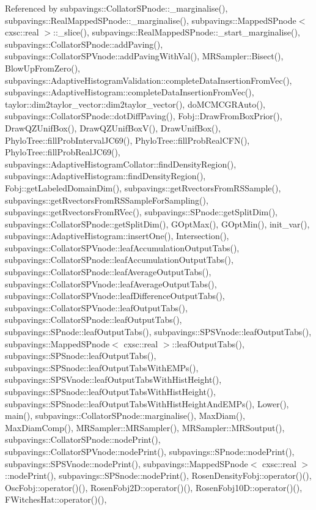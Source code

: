 \-Referenced by subpavings\-::\-Collator\-S\-Pnode\-::\-\_\-marginalise(), subpavings\-::\-Real\-Mapped\-S\-Pnode\-::\-\_\-marginalise(), subpavings\-::\-Mapped\-S\-Pnode$<$ cxsc\-::real $>$\-::\-\_\-slice(), subpavings\-::\-Real\-Mapped\-S\-Pnode\-::\-\_\-start\-\_\-marginalise(), subpavings\-::\-Collator\-S\-Pnode\-::add\-Paving(), subpavings\-::\-Collator\-S\-P\-Vnode\-::add\-Paving\-With\-Val(), \-M\-R\-Sampler\-::\-Bisect(), \-Blow\-Up\-From\-Zero(), subpavings\-::\-Adaptive\-Histogram\-Validation\-::complete\-Data\-Insertion\-From\-Vec(), subpavings\-::\-Adaptive\-Histogram\-::complete\-Data\-Insertion\-From\-Vec(), taylor\-::dim2taylor\-\_\-vector\-::dim2taylor\-\_\-vector(), do\-M\-C\-M\-C\-G\-R\-Auto(), subpavings\-::\-Collator\-S\-Pnode\-::dot\-Diff\-Paving(), \-Fobj\-::\-Draw\-From\-Box\-Prior(), \-Draw\-Q\-Z\-Unif\-Box(), \-Draw\-Q\-Z\-Unif\-Box\-V(), \-Draw\-Unif\-Box(), \-Phylo\-Tree\-::fill\-Prob\-Interval\-J\-C69(), \-Phylo\-Tree\-::fill\-Prob\-Real\-C\-F\-N(), \-Phylo\-Tree\-::fill\-Prob\-Real\-J\-C69(), subpavings\-::\-Adaptive\-Histogram\-Collator\-::find\-Density\-Region(), subpavings\-::\-Adaptive\-Histogram\-::find\-Density\-Region(), \-Fobj\-::get\-Labeled\-Domain\-Dim(), subpavings\-::get\-Rvectors\-From\-R\-S\-Sample(), subpavings\-::get\-Rvectors\-From\-R\-S\-Sample\-For\-Sampling(), subpavings\-::get\-Rvectors\-From\-R\-Vec(), subpavings\-::\-S\-Pnode\-::get\-Split\-Dim(), subpavings\-::\-Collator\-S\-Pnode\-::get\-Split\-Dim(), \-G\-Opt\-Max(), \-G\-Opt\-Min(), init\-\_\-var(), subpavings\-::\-Adaptive\-Histogram\-::insert\-One(), \-Intersection(), subpavings\-::\-Collator\-S\-P\-Vnode\-::leaf\-Accumulation\-Output\-Tabs(), subpavings\-::\-Collator\-S\-Pnode\-::leaf\-Accumulation\-Output\-Tabs(), subpavings\-::\-Collator\-S\-Pnode\-::leaf\-Average\-Output\-Tabs(), subpavings\-::\-Collator\-S\-P\-Vnode\-::leaf\-Average\-Output\-Tabs(), subpavings\-::\-Collator\-S\-P\-Vnode\-::leaf\-Difference\-Output\-Tabs(), subpavings\-::\-Collator\-S\-P\-Vnode\-::leaf\-Output\-Tabs(), subpavings\-::\-Collator\-S\-Pnode\-::leaf\-Output\-Tabs(), subpavings\-::\-S\-Pnode\-::leaf\-Output\-Tabs(), subpavings\-::\-S\-P\-S\-Vnode\-::leaf\-Output\-Tabs(), subpavings\-::\-Mapped\-S\-Pnode$<$ cxsc\-::real $>$\-::leaf\-Output\-Tabs(), subpavings\-::\-S\-P\-Snode\-::leaf\-Output\-Tabs(), subpavings\-::\-S\-P\-Snode\-::leaf\-Output\-Tabs\-With\-E\-M\-Ps(), subpavings\-::\-S\-P\-S\-Vnode\-::leaf\-Output\-Tabs\-With\-Hist\-Height(), subpavings\-::\-S\-P\-Snode\-::leaf\-Output\-Tabs\-With\-Hist\-Height(), subpavings\-::\-S\-P\-Snode\-::leaf\-Output\-Tabs\-With\-Hist\-Height\-And\-E\-M\-Ps(), \-Lower(), main(), subpavings\-::\-Collator\-S\-Pnode\-::marginalise(), \-Max\-Diam(), \-Max\-Diam\-Comp(), \-M\-R\-Sampler\-::\-M\-R\-Sampler(), \-M\-R\-Sampler\-::\-M\-R\-Soutput(), subpavings\-::\-Collator\-S\-Pnode\-::node\-Print(), subpavings\-::\-Collator\-S\-P\-Vnode\-::node\-Print(), subpavings\-::\-S\-Pnode\-::node\-Print(), subpavings\-::\-S\-P\-S\-Vnode\-::node\-Print(), subpavings\-::\-Mapped\-S\-Pnode$<$ cxsc\-::real $>$\-::node\-Print(), subpavings\-::\-S\-P\-Snode\-::node\-Print(), \-Rosen\-Density\-Fobj\-::operator()(), \-Osc\-Fobj\-::operator()(), \-Rosen\-Fobj2\-D\-::operator()(), \-Rosen\-Fobj10\-D\-::operator()(), \-F\-Witches\-Hat\-::operator()(), 